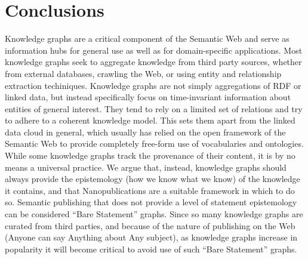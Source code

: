 \section{Conclusions}

Knowledge graphs are a critical component of the Semantic Web and serve as information hubs for general use as well as for domain-specific applications.
Most knowledge graphs seek to aggregate knowledge from third party sources, whether from external databases, crawling the Web, or using entity and relationship extraction techiniques.
Knowledge graphs are not simply aggregations of RDF or linked data, but instead specifically focus on time-invariant information about entities of general interest.
They tend to rely on a limited set of relations and try to adhere to a coherent knowledge model.
This sets them apart from the linked data cloud in general, which usually has relied on the open framework of the Semantic Web to provide completely free-form use of vocabularies and ontologies.
While some knowledge graphs track the provenance of their content, it is by no means a universal practice.
We argue that, instead, knowledge graphs should always provide the epistemology (how we know what we know) of the knowledge it contains, and that Nanopublications are a suitable framework in which to do so.
Semantic publishing that does not provide a level of statement epistemology can be considered ``Bare Statement'' graphs.
Since so many knowledge graphs are curated from third parties, and because of the nature of publishing on the Web (Anyone can say Anything about Any subject), as knowledge graphs increase in popularity it will become critical to avoid use of such ``Bare Statement'' graphs.
